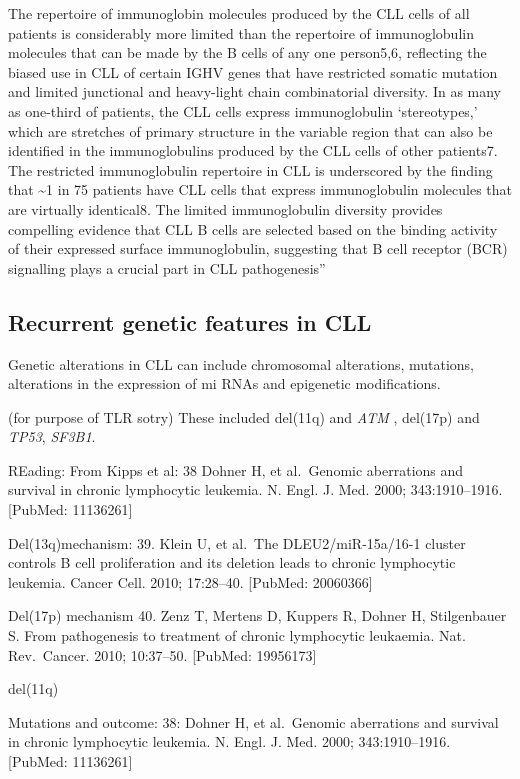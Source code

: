 \documentclass[11pt, a4paper, twosided]{book}
\begin{document}
The repertoire of immunoglobin molecules produced by the CLL cells of all patients is considerably more limited than the repertoire of immunoglobulin molecules that can be made by the B cells of any one person5,6, reflecting the biased use in CLL of certain IGHV genes that have restricted somatic mutation and limited junctional and heavy-light chain combinatorial diversity. In as many as one-third of patients, the CLL cells express immunoglobulin `stereotypes,' which are stretches of primary structure in the variable region that can also be identified in the immunoglobulins produced by the CLL cells of other patients7. The restricted immunoglobulin repertoire in CLL is underscored by the finding that \textasciitilde1 in 75 patients have CLL cells that express immunoglobulin molecules that are virtually identical8. The limited immunoglobulin diversity provides compelling evidence that CLL B cells are selected based on the binding activity of their expressed surface immunoglobulin, suggesting that B cell receptor (BCR) signalling plays a crucial part in CLL pathogenesis''

\hypertarget{recurrent-genetic-features-in-cll}{%
\subsection{Recurrent genetic features in CLL}\label{recurrent-genetic-features-in-cll}}

Genetic alterations in CLL can include chromosomal alterations, mutations, alterations in the expression of mi RNAs and epigenetic modifications.

(for purpose of TLR sotry)
These included del(11q) and \emph{ATM} ,
del(17p) and \emph{TP53},
\emph{SF3B1}.

REading:
From Kipps et al:
38 Dohner H, et al.~Genomic aberrations and survival in chronic lymphocytic leukemia. N. Engl. J. Med. 2000; 343:1910--1916. {[}PubMed: 11136261{]}

Del(13q)mechanism: 39. Klein U, et al.~The DLEU2/miR-15a/16-1 cluster controls B cell proliferation and its deletion leads to chronic lymphocytic leukemia. Cancer Cell. 2010; 17:28--40. {[}PubMed: 20060366{]}

Del(17p) mechanism 40. Zenz T, Mertens D, Kuppers R, Dohner H, Stilgenbauer S. From pathogenesis to treatment of chronic lymphocytic leukaemia. Nat. Rev.~Cancer. 2010; 10:37--50. {[}PubMed: 19956173{]}

del(11q)

Mutations and outcome:
38: Dohner H, et al.~Genomic aberrations and survival in chronic lymphocytic leukemia. N. Engl. J. Med. 2000; 343:1910--1916. {[}PubMed: 11136261{]}
\end{document}

